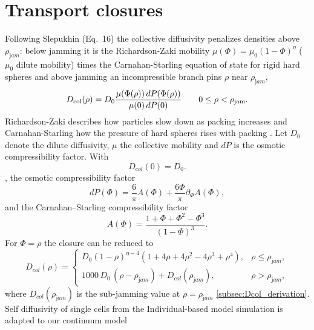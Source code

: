 \documentclass[11pt,a4paper]{report}
\begin{document}
	\section{Transport closures}
	\label{transport}
	Following Slepukhin (Eq.~16)\cite{slepukhin} the collective diffusivity penalizes densities above $\rho_{\mathrm jam}$: below jamming it is the Richardson-Zaki \cite{zaki, Karita} mobility $\mu(\Phi)=\mu_0(1-\Phi)^{\eta}$ ($\mu_0$ dilute mobility) times the Carnahan-Starling equation of state for rigid hard spheres \cite{carnahan} and above jamming an incompressible branch pins $\rho$ near $\rho_{\mathrm jam}$,
	\begin{equation}
		{
			D_{\rm col}(\rho)
			=
			D_0
			\frac{\mu(\Phi(\rho))\,dP(\Phi(\rho))}
			{\mu(0)\,dP(0)}
		}
		\qquad 0\le \rho<\rho_{\rm jam}.
		\label{eq:Dcol_slepukhin_closure}
	\end{equation}
Richardson-Zaki describes how particles slow down as packing increases and
Carnahan-Starling how the pressure of hard spheres rises with packing \cite{zaki,carnahan,Karita}. 
	Let $D_0$ denote the dilute diffusivity, $\mu$ the collective
	mobility and $dP$ is the osmotic compressibility factor. With
	\begin{equation}
		D_{\mathrm col}(0)=D_0.
		\label{eq:Dcol_dilute_normalization}
	\end{equation}
	, the osmotic compressibility factor
	\begin{equation}
		dP(\Phi)
		=
		\frac{6}{\pi}A(\Phi)
		+
		\frac{6\Phi}{\pi}\partial_\Phi A(\Phi),
		\label{eq:dP_definition}
	\end{equation}
	and the Carnahan–Starling compressibility factor \cite{carnahan}
	\begin{equation}
		A(\Phi)=
		\frac{1+\Phi+\Phi^2-\Phi^3}{(1-\Phi)^3}.
		\label{eq:A_definition}
	\end{equation}
	For $\Phi=\rho$ the closure can be reduced to
	\begin{equation}
		D_{col}(\rho)=
		\begin{cases}
			D_0(1-\rho)^{\eta-4}\left(1+4\rho+4\rho^2-4\rho^3+\rho^4\right), & \rho\leq\rho_{\mathrm jam},\\[0.5em]
			1000\,D_0\,(\rho-\rho_{\mathrm jam})+D_{col}(\rho_{\mathrm jam}), & \rho>\rho_{\mathrm jam},
		\end{cases}
		\label{eq:Dcol}
	\end{equation}
	where $D_{col}(\rho_{\mathrm jam})$ is the sub-jamming value at $\rho=\rho_{\mathrm jam}$ \ref{subsec:Dcol_derivation}.
	Self diffusivity of single cells from the Individual-based model simulation \cite{slepukhin} is adapted to our continuum model
\end{document}
